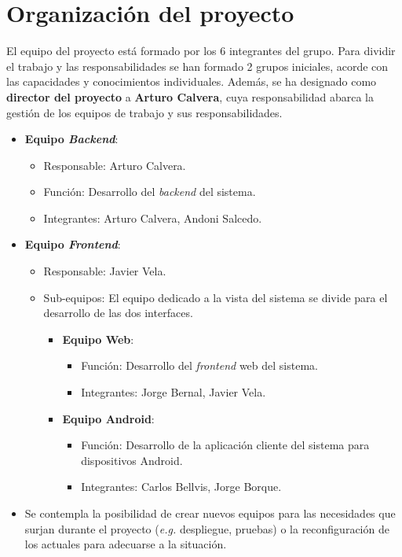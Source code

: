 \documentclass{article}
\begin{document}
\section{Organización del proyecto}

El equipo del proyecto está formado por los 6 integrantes del grupo. Para dividir el trabajo y las responsabilidades se han formado 2 grupos iniciales, acorde con las capacidades y conocimientos individuales. Además, se ha designado como \textbf{director del proyecto} a \textbf{Arturo Calvera}, cuya responsabilidad abarca la gestión de los equipos de trabajo y sus responsabilidades.

\begin{itemize}
    \item \textbf{Equipo \textit{Backend}}:
    \begin{itemize}
        \item Responsable: Arturo Calvera.
        \item Función: Desarrollo del \textit{backend} del sistema.
        \item Integrantes: Arturo Calvera, Andoni Salcedo.
    \end{itemize}
    \item \textbf{Equipo \textit{Frontend}}:
    \begin{itemize}
        \item Responsable: Javier Vela.
        \item Sub-equipos: El equipo dedicado a la vista del sistema se divide para el desarrollo de las dos interfaces.
        \begin{itemize}
            \item \textbf{Equipo Web}:
            \begin{itemize}
                \item Función: Desarrollo del \textit{frontend} web del sistema.
                \item Integrantes: Jorge Bernal, Javier Vela.
            \end{itemize}
        \item \textbf{Equipo Android}:
            \begin{itemize}
                \item Función: Desarrollo de la aplicación cliente del sistema para dispositivos Android.
                \item Integrantes: Carlos Bellvis, Jorge Borque.
            \end{itemize}
        \end{itemize}
    \end{itemize}
    \item Se contempla la posibilidad de crear nuevos equipos para las necesidades que surjan durante el proyecto (\textit{e.g.} despliegue, pruebas) o la reconfiguración de los actuales para adecuarse a la situación.
\end{itemize}
\end{document}
